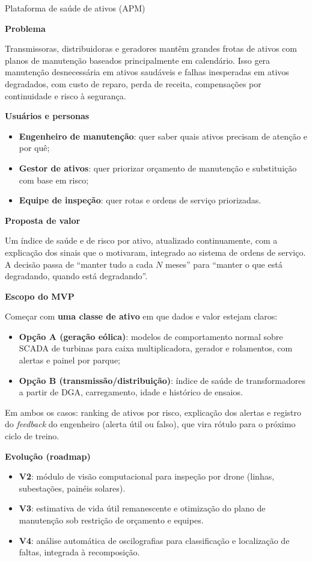\documentclass[11pt,a4paper]{article}
\newcommand{\prodsec}[1]{\par\medskip\noindent\textbf{\color{prodcolor}#1}\par\smallskip}
\begin{document}
\begin{produto}{Plataforma de saúde de ativos (APM)}

\prodsec{Problema}
Transmissoras, distribuidoras e geradores mantêm grandes frotas de ativos com
planos de manutenção baseados principalmente em calendário. Isso gera
manutenção desnecessária em ativos saudáveis e falhas inesperadas em ativos
degradados, com custo de reparo, perda de receita, compensações por
continuidade e risco à segurança.

\prodsec{Usuários e personas}
\begin{itemize}
  \item \textbf{Engenheiro de manutenção}: quer saber quais ativos precisam de
    atenção e por quê;
  \item \textbf{Gestor de ativos}: quer priorizar orçamento de manutenção e
    substituição com base em risco;
  \item \textbf{Equipe de inspeção}: quer rotas e ordens de serviço
    priorizadas.
\end{itemize}

\prodsec{Proposta de valor}
Um índice de saúde e de risco por ativo, atualizado continuamente, com a
explicação dos sinais que o motivaram, integrado ao sistema de ordens de
serviço. A decisão passa de ``manter tudo a cada $N$ meses'' para ``manter o
que está degradando, quando está degradando''.

\prodsec{Escopo do MVP}
Começar com \textbf{uma classe de ativo} em que dados e valor estejam claros:
\begin{itemize}
  \item \textbf{Opção A (geração eólica)}: modelos de comportamento normal
    sobre SCADA de turbinas para caixa multiplicadora, gerador e rolamentos,
    com alertas e painel por parque;
  \item \textbf{Opção B (transmissão/distribuição)}: índice de saúde de
    transformadores a partir de DGA, carregamento, idade e histórico de
    ensaios.
\end{itemize}
Em ambos os casos: ranking de ativos por risco, explicação dos alertas e
registro do \textit{feedback} do engenheiro (alerta útil ou falso), que vira
rótulo para o próximo ciclo de treino.

\prodsec{Evolução (roadmap)}
\begin{itemize}
  \item \textbf{V2}: módulo de visão computacional para inspeção por drone
    (linhas, subestações, painéis solares).
  \item \textbf{V3}: estimativa de vida útil remanescente e otimização do
    plano de manutenção sob restrição de orçamento e equipes.
  \item \textbf{V4}: análise automática de oscilografias para
    classificação e localização de faltas, integrada à recomposição.
\end{itemize}


\end{produto}
\end{document}
